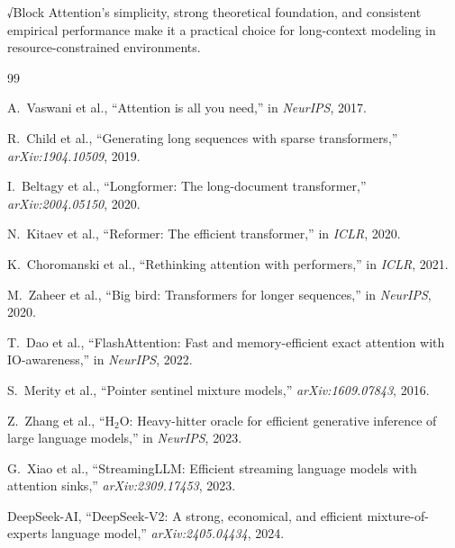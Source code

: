 \documentclass[11pt,a4paper]{article}
\begin{document}
√Block Attention's simplicity, strong theoretical foundation, and consistent empirical performance make it a practical choice for long-context modeling in resource-constrained environments.


\begin{thebibliography}{99}

A.~Vaswani et al., ``Attention is all you need,'' in \textit{NeurIPS}, 2017.

R.~Child et al., ``Generating long sequences with sparse transformers,'' \textit{arXiv:1904.10509}, 2019.

I.~Beltagy et al., ``Longformer: The long-document transformer,'' \textit{arXiv:2004.05150}, 2020.

N.~Kitaev et al., ``Reformer: The efficient transformer,'' in \textit{ICLR}, 2020.

K.~Choromanski et al., ``Rethinking attention with performers,'' in \textit{ICLR}, 2021.

M.~Zaheer et al., ``Big bird: Transformers for longer sequences,'' in \textit{NeurIPS}, 2020.

T.~Dao et al., ``FlashAttention: Fast and memory-efficient exact attention with IO-awareness,'' in \textit{NeurIPS}, 2022.

S.~Merity et al., ``Pointer sentinel mixture models,'' \textit{arXiv:1609.07843}, 2016.

Z.~Zhang et al., ``H$_2$O: Heavy-hitter oracle for efficient generative inference of large language models,'' in \textit{NeurIPS}, 2023.

G.~Xiao et al., ``StreamingLLM: Efficient streaming language models with attention sinks,'' \textit{arXiv:2309.17453}, 2023.

DeepSeek-AI, ``DeepSeek-V2: A strong, economical, and efficient mixture-of-experts language model,'' \textit{arXiv:2405.04434}, 2024.

\end{thebibliography}
\end{document}
